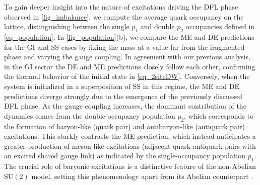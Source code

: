 \documentclass[aps,prl,reprint,twocolumn,superscriptaddress,floatfix,nofootinbib]{revtex4-2}
\begin{document}
To gain deeper insight into the nature of excitations driving the DFL phase observed in \cref{fig_imbalance}, we compute the average quark occupancy on the lattice, distinguishing between the single $p_1$ and double $p_2$ occupancies defined in \cref{eq_population}.
In \cref{fig_population}(b), we compare the ME and DE predictions for the GI and SS cases by fixing the mass at a value far from the fragmented phase and varying the gauge coupling.
In agreement with our previous analysis, in the GI sector the DE and ME predictions closely follow each other, confirming the thermal behavior of the initial state in \cref{eq_2siteDW}.
Conversely, when the system is initialized in a superposition of SS in this regime, the ME and DE predictions diverge strongly due to the emergence of the previously discussed DFL phase.
As the gauge coupling increases, the dominant contribution of the dynamics comes from the double-occupancy population $p_{2}$, which corresponds to the formation of baryon-like (quark pair) and antibaryon-like (antiquark pair) excitations.
This starkly contrasts the ME prediction, which instead anticipates a greater production of meson-like excitations (adjacent quark-antiquark pairs with an excited shared gauge link) as indicated by the single-occupancy population $p_{1}$.
The crucial role of baryonic excitations is a distinctive feature of the non-Abelian $\mathrm{SU}(2)$ model, setting this phenomenology apart from its Abelian counterpart \cite{Brenes2018ManyBodyLocalizationDynamics}.
\end{document}
